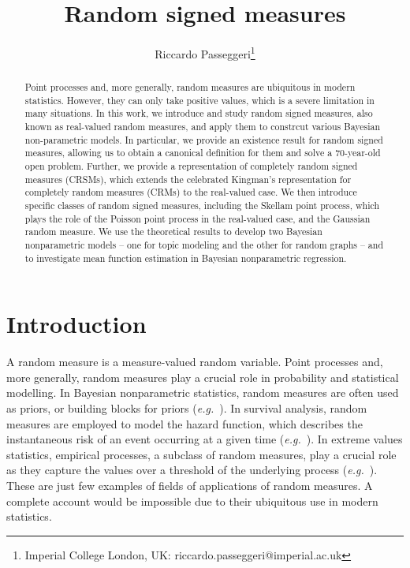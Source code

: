\documentclass{article}
\title{Random signed measures}
\author{Riccardo Passeggeri\footnote{Imperial College London, UK: riccardo.passeggeri@imperial.ac.uk}}
\theoremstyle{plain}
\theoremstyle{remark}
\begin{document}
	\maketitle
	
	\begin{abstract}
		Point processes and, more generally, random measures are ubiquitous in modern statistics. However, they can only take positive values, which is a severe limitation in many situations. In this work, we introduce and study random signed measures, also known as real-valued random measures, and apply them to constrcut various Bayesian non-parametric models. In particular, we provide an existence result for random signed measures, allowing us to obtain a canonical definition for them and solve a 70-year-old open problem. Further, we provide a representation of completely random signed measures (CRSMs), which extends the celebrated Kingman's representation for completely random measures (CRMs) to the real-valued case. We then introduce specific classes of random signed measures, including the Skellam point process, which plays the role of the Poisson point process in the real-valued case, and the Gaussian random measure. We use the theoretical results to develop two Bayesian nonparametric models -- one for topic modeling and the other for random graphs -- and to investigate mean function estimation in Bayesian nonparametric regression.
	\end{abstract}
	
	
	
	
	
	
	
	\section{Introduction}
A random measure is a measure-valued random variable. Point processes and, more generally, random measures play a crucial role in probability and statistical modelling. In Bayesian nonparametric statistics, random measures are often used as priors, or building blocks for priors (\textit{e.g.}~\citet{beraha2024,Bro1,Bro2,Catalano,griffin2017compound,James,Regazzini}). In survival analysis, random measures are employed to model the hazard function, which describes the instantaneous risk of an event occurring at a given time (\textit{e.g.}~\citet{DeBlasiPeccatiPrunster,LijoiNipoti,LoWeng1989}). In extreme values statistics, empirical processes, a subclass of random measures, play a crucial role as they capture the values over a threshold of the underlying process (\textit{e.g.}~\citet{BASRAK2009,CouVer22,kulik2020heavy,PassO}). These are just few examples of fields of applications of random measures. A complete account would be impossible due to their ubiquitous use in modern statistics.
\end{document}
